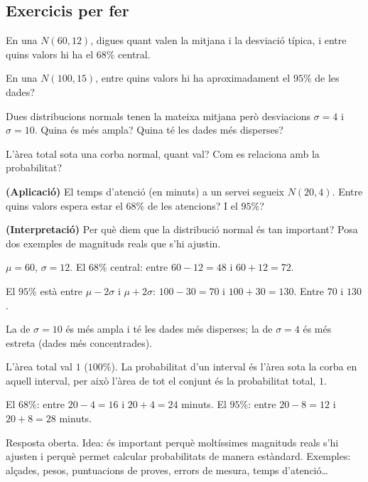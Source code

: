 \subsection{Exercicis per fer}

\begin{exercicis}
\begin{exlist}
  \item En una $N(60,12)$, digues quant valen la mitjana i la desviació típica, i entre
        quins valors hi ha el $68\%$ central.
  \item En una $N(100,15)$, entre quins valors hi ha aproximadament el $95\%$ de les
        dades?
  \item Dues distribucions normals tenen la mateixa mitjana però desviacions $\sigma=4$ i
        $\sigma=10$. Quina és més ampla? Quina té les dades més disperses?
  \item L'àrea total sota una corba normal, quant val? Com es relaciona amb la
        probabilitat?
  \item \textbf{(Aplicació)} El temps d'atenció (en minuts) a un servei segueix
        $N(20,4)$. Entre quins valors espera estar el $68\%$ de les atencions? I el
        $95\%$?
  \item \textbf{(Interpretació)} Per què diem que la distribució normal és tan important?
        Posa dos exemples de magnituds reals que s'hi ajustin.
\end{exlist}
\end{exercicis}

\begin{solucions}
\begin{sollist}
  \item $\mu=60$, $\sigma=12$. El $68\%$ central: entre $60-12=48$ i $60+12=72$.
  \item El $95\%$ està entre $\mu-2\sigma$ i $\mu+2\sigma$: $100-30=70$ i $100+30=130$.
        Entre $70$ i $130$.
  \item La de $\sigma=10$ és més ampla i té les dades més disperses; la de $\sigma=4$ és
        més estreta (dades més concentrades).
  \item L'àrea total val $1$ ($100\%$). La probabilitat d'un interval és l'àrea sota la
        corba en aquell interval, per això l'àrea de tot el conjunt és la probabilitat
        total, $1$.
  \item El $68\%$: entre $20-4=16$ i $20+4=24$ minuts. El $95\%$: entre $20-8=12$ i
        $20+8=28$ minuts.
  \item Resposta oberta. Idea: és important perquè moltíssimes magnituds reals s'hi
        ajusten i perquè permet calcular probabilitats de manera estàndard. Exemples:
        alçades, pesos, puntuacions de proves, errors de mesura, temps d'atenció\ldots
\end{sollist}
\end{solucions}
